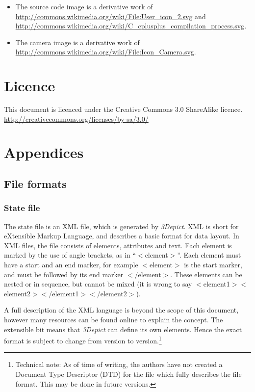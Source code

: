 \documentclass[10pt]{article}
\begin{document}
\begin{itemize}
\item The source code image is  a derivative work of \url{http://commons.wikimedia.org/wiki/File:User_icon_2.svg} and  \url{http://commons.wikimedia.org/wiki/C_cplusplus_compilation_process.svg}.

\item The camera image is a derivative work of \url{http://commons.wikimedia.org/wiki/File:Icon_Camera.svg}.
\end{itemize}

\section{Licence}
This document is licenced under the Creative Commons 3.0 ShareAlike licence. \url{http://creativecommons.org/licenses/by-sa/3.0/}

\section{Appendices}

\subsection{File formats}

\subsubsection{State file}
\label{sec:xmlstatefile}
The state file is an XML file, which is generated by \emph{3Depict}. XML is short for eXtensible Markup Language, and describes  a basic format for data layout. In XML files, the file consists of elements, attributes and text. Each element is marked by the use of angle brackets, as in ``$<$element$>$''. Each element must have a start and an end marker, for example $<$element$>$ is the start marker, and must be followed by its end marker $<$/element$>$. These elements can be nested or in sequence, but cannot be mixed (it is wrong to say $<$element1$>$$<$element2$>$$<$/element1$>$$<$/element2$>$). 

A full description of the XML language is beyond the scope of this document, however many resources can be found online to explain the concept. The extensible bit means that \emph{3Depict} can define its own elements. Hence the exact format is subject to change from version to version.\footnote{Technical note: As of time of writing, the authors have not created a Document Type Descriptor (DTD) for the file which fully describes the file format. This may be done in future versions.}
\end{document}
